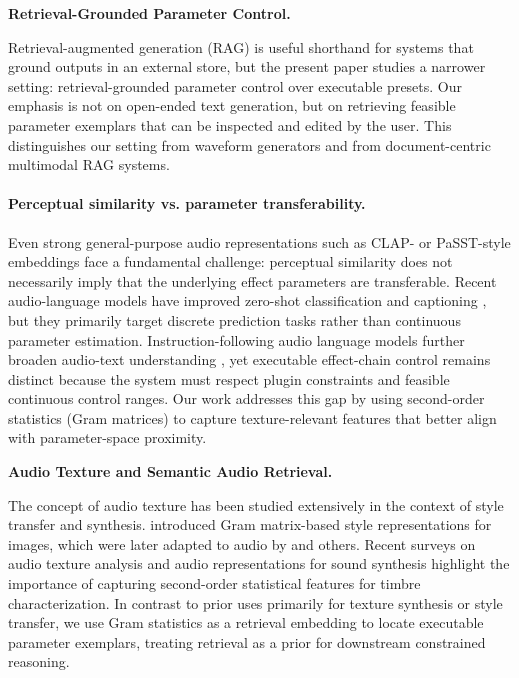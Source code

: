 \noindent\textbf{Retrieval-Grounded Parameter Control.}

Retrieval-augmented generation (RAG) \citep{lewis2020rag} is useful shorthand for systems that ground outputs in an external store, but the present paper studies a narrower setting: retrieval-grounded parameter control over executable presets. Our emphasis is not on open-ended text generation, but on retrieving feasible parameter exemplars that can be inspected and edited by the user. This distinguishes our setting from waveform generators and from document-centric multimodal RAG systems.

\paragraph{Perceptual similarity vs. parameter transferability.}
Even strong general-purpose audio representations such as CLAP- or PaSST-style embeddings face a fundamental challenge: perceptual similarity does not necessarily imply that the underlying effect parameters are transferable. Recent audio-language models have improved zero-shot classification and captioning \citep{elizalde2023clap,chen2024reclap,niizumi2024m2dclap,wu2024fewshot}, but they primarily target discrete prediction tasks rather than continuous parameter estimation. Instruction-following audio language models further broaden audio-text understanding \citep{qwen_audio,salmonn}, yet executable effect-chain control remains distinct because the system must respect plugin constraints and feasible continuous control ranges. Our work addresses this gap by using second-order statistics (Gram matrices) to capture texture-relevant features that better align with parameter-space proximity.

\noindent\textbf{Audio Texture and Semantic Audio Retrieval.}

The concept of audio texture has been studied extensively in the context of style transfer and synthesis. \citet{gatys2015style} introduced Gram matrix-based style representations for images, which were later adapted to audio by \citet{stylianou2015audio} and others. Recent surveys on audio texture analysis \citep{mcwec2023texture} and audio representations for sound synthesis \citep{verzotto2022representations} highlight the importance of capturing second-order statistical features for timbre characterization.
In contrast to prior uses primarily for texture synthesis or style transfer, we use Gram statistics as a retrieval embedding to locate executable parameter exemplars, treating retrieval as a prior for downstream constrained reasoning.

